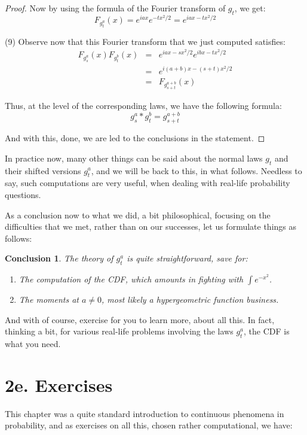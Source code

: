 \documentclass[12pt]{amsbook}
\newtheorem{conclusion}[theorem]{Conclusion}
\begin{document}
\begin{proof}
Now by using the formula of the Fourier transform of $g_t$, we get:
$$F_{g_t^a}(x)=e^{iax}e^{-tx^2/2}=e^{iax-tx^2/2}$$
 
(9) Observe now that this Fourier transform that we just computed satisfies:
\begin{eqnarray*}
F_{g_s^a}(x)F_{g_t^b}(x)
&=&e^{iax-sx^2/2}e^{ibx-tx^2/2}\\
&=&e^{i(a+b)x-(s+t)x^2/2}\\
&=&F_{g_{s+t}^{a+b}}(x)
\end{eqnarray*}

Thus, at the level of the corresponding laws, we have the following formula:
$$g_s^a*g_t^b=g_{s+t}^{a+b}$$

And with this, done, we are led to the conclusions in the statement.
\end{proof}

In practice now, many other things can be said about the normal laws $g_t$ and their shifted versions $g_t^a$, and we will be back to this, in what follows. Needless to say, such computations are very useful, when dealing with real-life probability questions.

\bigskip

As a conclusion now to what we did, a bit philosophical, focusing on the difficulties that we met, rather than on our successes, let us formulate things as follows:

\begin{conclusion}
The theory of $g_t^a$ is quite straightforward, save for:
\begin{enumerate}
\item The computation of the CDF, which amounts in fighting with $\int e^{-x^2}$.

\item The moments at $a\neq0$, most likely a hypergeometric function business.
\end{enumerate}
\end{conclusion}

And with of course, exercise for you to learn more, about all this. In fact, thinking a bit, for various real-life problems involving the laws $g_t^a$, the CDF is what you need.

\section*{2e. Exercises}

This chapter was a quite standard introduction to continuous phenomena in probability, and as exercises on all this, chosen rather computational, we have:
\end{document}
